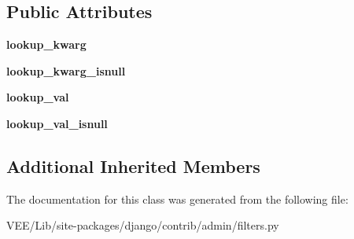 \subsection*{Public Attributes}
\begin{DoxyCompactItemize}
\item 
\mbox{\label{classdjango_1_1contrib_1_1admin_1_1filters_1_1_choices_field_list_filter_ad41ddf9c5cb73f629b8bfa884d3fdf31}} 
{\bfseries lookup\+\_\+kwarg}
\item 
\mbox{\label{classdjango_1_1contrib_1_1admin_1_1filters_1_1_choices_field_list_filter_a1a16105c3cff8cd96dd349aec972f86c}} 
{\bfseries lookup\+\_\+kwarg\+\_\+isnull}
\item 
\mbox{\label{classdjango_1_1contrib_1_1admin_1_1filters_1_1_choices_field_list_filter_ac25c82759550670e06c6f66a7d8b9e51}} 
{\bfseries lookup\+\_\+val}
\item 
\mbox{\label{classdjango_1_1contrib_1_1admin_1_1filters_1_1_choices_field_list_filter_a69ac9477f2bb7440ba0e1a4b4691f85f}} 
{\bfseries lookup\+\_\+val\+\_\+isnull}
\end{DoxyCompactItemize}
\subsection*{Additional Inherited Members}


The documentation for this class was generated from the following file\+:\begin{DoxyCompactItemize}
\item 
V\+E\+E/\+Lib/site-\/packages/django/contrib/admin/filters.\+py\end{DoxyCompactItemize}
